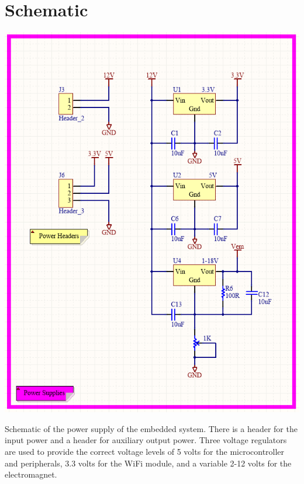 \documentclass[12pt]{article}
\begin{document}
\section*{Schematic}
\indent

\vspace*{5mm}

\centerline{\includegraphics[scale=.75]{SchPowerSupply}}

\begin{center}
Schematic of the power supply of the embedded system. There is a header for the input power and a header for auxiliary output power. Three voltage regulators are used to provide the correct voltage levels of 5 volts for the microcontroller and peripherals, 3.3 volts for the WiFi module, and a variable 2-12 volts for the electromagnet.
\end{center}

\vspace*{5mm}

\vspace*{5mm}
\end{document}
